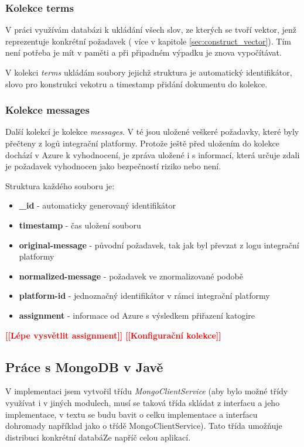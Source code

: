 \documentclass[thesis=M,czech]{FITthesis}[2012/10/20]
\newcommand{\todo}[1]{\textcolor{red}{\textbf{[[#1]]}}}
\begin{document}
			\subsubsection{Kolekce terms}
			V práci využívám databázi k ukládání všech slov, ze kterých se tvoří vektor, jenž reprezentuje konkrétní požadavek ( více v kapitole \ref{sec:construct_vector}). Tím není potřeba je mít v paměti a při připadném výpadku je znova vypočítávat.
			
			 V kolekci \textit{terms} ukládám soubory jejichž struktura je automatický identifikátor, slovo pro konstrukci vekotru a timestamp přidání dokumentu do kolekce.
			
			\subsubsection{Kolekce messages}
			Další kolekcí je kolekce \textit{messages}. V té jsou uložené veškeré požadavky, které byly přečteny z logů integrační platformy. Protože ještě před uložením do kolekce dochází v Azure k vyhodnocení, je zpráva uložené i s informací, která určuje zdali je požadavek vyhodnocen jako bezpečností riziko nebo není. 
			
			Struktura každého souboru je: 
			
			\begin{itemize} 
				\item \textbf{\_id} - automaticky generovaný identifikátor
				\item \textbf{timestamp} - čas uložení souboru
				\item \textbf{original-message} - původní požadavek, tak jak byl převzat z logu integrační platformy
				\item \textbf{normalized-message} - požadavek ve znormalizované podobě
				\item \textbf{platform-id} - jednoznačný identifikátor v rámci integrační platformy
				\item \textbf{assignment} - informace od Azure s výsledkem přiřazení katogire 	
			\end{itemize}
		
		\todo{Lépe vysvětlit assignment}
		\todo{Konfigurační kolekce}
		
		\subsection{Práce s MongoDB v Javě}
		V implementaci jsem vytvořil třídu \textit{MongoClientService} (aby bylo možné třídy využívat i v jiných modulech, musí se taková třída skládat z interfacu a jeho implementace, v textu se budu bavit o celku implementace a interfacu dohromady například jako o třídě MongoClientService). Tato třída umožňuje distribuci konkrétní databáZe napříč celou aplikací. 
		
\end{document}
